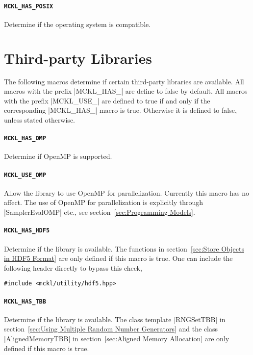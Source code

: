 \paragraph{\texttt{MCKL\_HAS\_POSIX}} Determine if the operating system is
\posix compatible.

\section{Third-party Libraries}
\label{sec:Third-party Libraries}

The following macros determine if certain third-party libraries are available.
All macros with the prefix |MCKL_HAS_| are define to false by default. All
macros with the prefix |MCKL_USE_| are defined to true if and only if the
corresponding |MCKL_HAS_| macro is true. Otherwise it is defined to false,
unless stated otherwise.

\paragraph{\texttt{MCKL\_HAS\_OMP}} Determine if OpenMP is supported.

\paragraph{\texttt{MCKL\_USE\_OMP}} Allow the library to use OpenMP for
parallelization. Currently this macro has no affect. The use of OpenMP for
parallelization is explicitly through |SamplerEvalOMP| etc., see
section~\ref{sec:Programming Models}.

\paragraph{\texttt{MCKL\_HAS\_HDF5}} Determine if the \hdf library is
available. The functions in section~\ref{sec:Store Objects in HDF5 Format} are
only defined if this macro is true. One can include the following header
directly to bypass this check,
\begin{verbatim}
#include <mckl/utility/hdf5.hpp>
\end{verbatim}

\paragraph{\texttt{MCKL\_HAS\_TBB}} Determine if the \tbb library is available.
The class template |RNGSetTBB| in section~\ref{sec:Using Multiple Random Number
  Generators} and the class |AlignedMemoryTBB| in section~\ref{sec:Aligned
Memory Allocation} are only defined if this macro is true.

